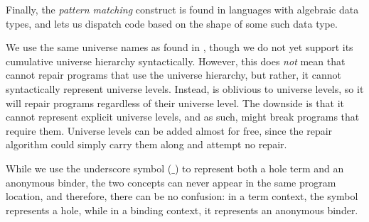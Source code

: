 Finally, the \emph{pattern matching} construct is found in languages with
algebraic data types, and lets us dispatch code based on the shape of some
such data type.

We use the same universe names as found in \Gallina{}, though we do not yet
support its cumulative universe hierarchy syntactically.  However, this does
\emph{not} mean that \Chick{} cannot repair \Gallina{} programs that use the
universe hierarchy, but rather, it cannot syntactically represent universe
levels.  Instead, \Chick{} is oblivious to universe levels, so it will repair
programs regardless of their universe level.  The downside is that it cannot
represent explicit universe levels, and as such, might break programs that
require them.  Universe levels can be added almost for free, since the repair
algorithm could simply carry them along and attempt no repair.

While we use the underscore symbol ($\_$) to represent both a hole term and an
anonymous binder, the two concepts can never appear in the same program
location, and therefore, there can be no confusion: in a term context, the
symbol represents a hole, while in a binding context, it represents an anonymous
binder.
